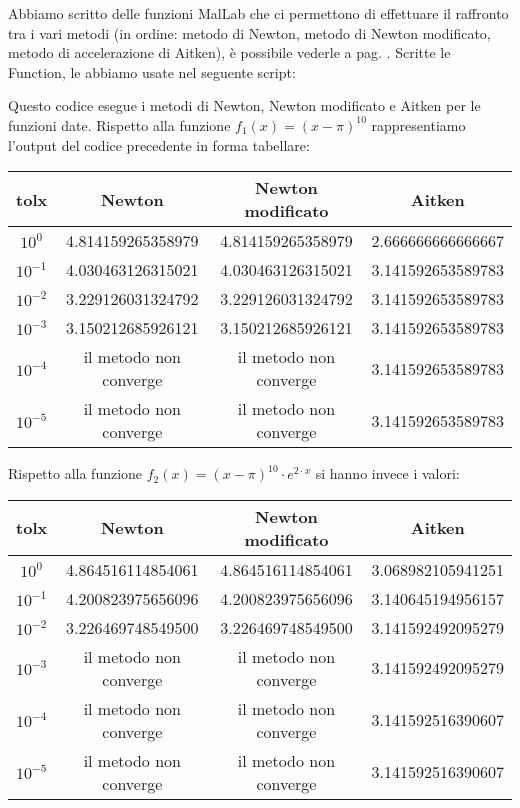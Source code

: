 \begin{flushleft}
Abbiamo scritto delle funzioni MalLab che ci permettono di effettuare il raffronto tra i vari metodi (in ordine: metodo di Newton, metodo di Newton modificato, metodo di accelerazione di Aitken), è possibile vederle a pag. \pageref{functcap2}. Scritte le Function, le abbiamo usate nel seguente script: 

Questo codice esegue i metodi di Newton, Newton modificato e Aitken per le funzioni date. Rispetto alla funzione $f_1(x)=(x-\pi)^{10}$ rappresentiamo l'output del codice precedente in forma tabellare: 
\begin{center}
\begin{tabular}{|c|c|c|c|}
\hline
tolx & Newton & Newton modificato & Aitken \\
\hline
$10^{0}$ & 4.814159265358979 & 4.814159265358979 & 2.666666666666667 \\
$10^{-1}$ & 4.030463126315021 & 4.030463126315021 & 3.141592653589783 \\
$10^{-2}$ & 3.229126031324792 & 3.229126031324792 & 3.141592653589783 \\
$10^{-3}$ & 3.150212685926121 &  3.150212685926121 &  3.141592653589783 \\ 
$10^{-4}$ & il metodo non converge & il metodo non converge & 3.141592653589783 \\
$10^{-5}$ & il metodo non converge & il metodo non converge & 3.141592653589783 \\
\hline
\end{tabular}
\end{center}
Rispetto alla funzione $f_2(x) = (x-\pi)^{10} \cdot e^{2\cdot x}$ si hanno invece i valori:
\begin{center}
\begin{tabular}{|c|c|c|c|}
\hline
tolx & Newton & Newton modificato & Aitken \\
\hline
$10^{0}$ & 4.864516114854061 & 4.864516114854061 & 3.068982105941251 \\
$10^{-1}$ & 4.200823975656096 & 4.200823975656096 & 3.140645194956157 \\
$10^{-2}$ & 3.226469748549500 & 3.226469748549500 & 3.141592492095279 \\
$10^{-3}$ & il metodo non converge & il metodo non converge &  3.141592492095279 \\ 
$10^{-4}$ & il metodo non converge & il metodo non converge & 3.141592516390607 \\
$10^{-5}$ & il metodo non converge & il metodo non converge & 3.141592516390607 \\
\hline
\end{tabular}
\end{center}
\end{flushleft}
